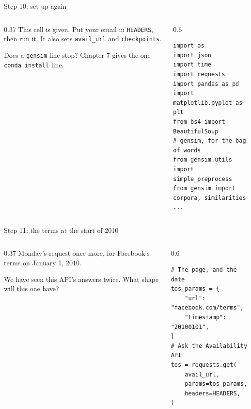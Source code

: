\documentclass[9pt,aspectratio=169]{beamer}
\begin{document}
\begin{frame}[fragile]{Step 10: set up again}
    \begin{columns}[T]
        \begin{column}{0.37\textwidth}
            This cell is given. Put your email in \texttt{HEADERS}, then run it. It also sets \texttt{avail\_url} and \texttt{checkpoints}.

            \medskip
            Does a \texttt{gensim} line stop? Chapter 7 gives the one \texttt{conda install} line.
        \end{column}
        \begin{column}{0.6\textwidth}
\begin{lstlisting}
import os
import json
import time
import requests
import pandas as pd
import matplotlib.pyplot as plt
from bs4 import BeautifulSoup
# gensim, for the bag of words
from gensim.utils import simple_preprocess
from gensim import corpora, similarities
...
\end{lstlisting}
        \end{column}
    \end{columns}
\end{frame}

\begin{frame}[fragile]{Step 11: the terms at the start of 2010}
    \begin{columns}[T]
        \begin{column}{0.37\textwidth}
            Monday's request once more, for Facebook's terms on January 1, 2010.

            \medskip
            We have seen this API's answers twice. What shape will this one have?
        \end{column}
        \begin{column}{0.6\textwidth}
\begin{lstlisting}
# The page, and the date
tos_params = {
    "url": "facebook.com/terms",
    "timestamp": "20100101",
}
# Ask the Availability API
tos = requests.get(
    avail_url,
    params=tos_params,
    headers=HEADERS,
)
\end{lstlisting}
        \end{column}
    \end{columns}
\end{frame}
\end{document}

